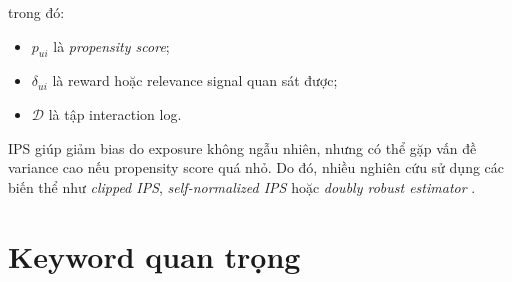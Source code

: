\documentclass[12pt,a4paper]{article}
\begin{document}
trong đó:

\begin{itemize}[leftmargin=*]
    \item $p_{ui}$ là \textit{propensity score};
    \item $\delta_{ui}$ là reward hoặc relevance signal quan sát được;
    \item $\mathcal{D}$ là tập interaction log.
\end{itemize}

IPS giúp giảm bias do exposure không ngẫu nhiên, nhưng có thể gặp vấn đề variance cao nếu propensity score quá nhỏ. 
Do đó, nhiều nghiên cứu sử dụng các biến thể như \textit{clipped IPS}, \textit{self-normalized IPS} hoặc \textit{doubly robust estimator} \cite{saito2020unbiased,liang2016modeling}.

\section{Keyword quan trọng}
\end{document}
